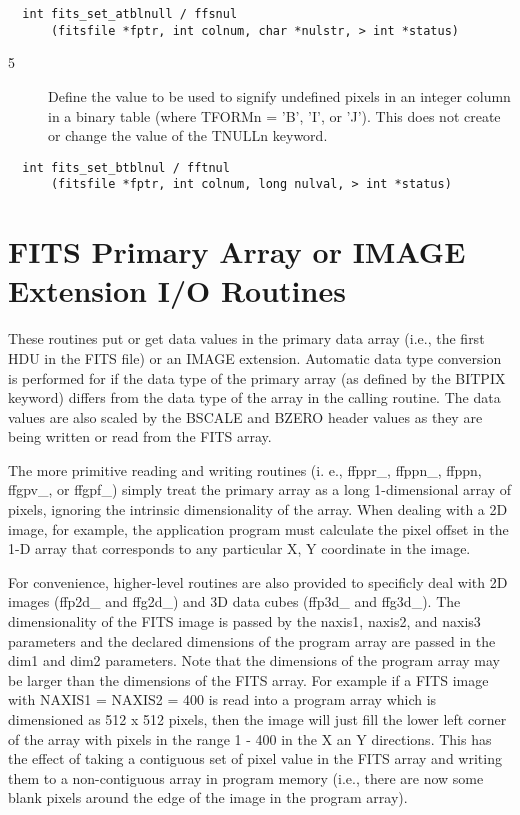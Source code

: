\begin{verbatim}
  int fits_set_atblnull / ffsnul
      (fitsfile *fptr, int colnum, char *nulstr, > int *status)
\end{verbatim}

\begin{description}
\item[5 ] Define the value to be used to signify undefined pixels in
    an integer column in a binary table (where TFORMn = 'B', 'I', or 'J').
   This does not create or  change the value of the TNULLn keyword.
\end{description}

\begin{verbatim}
  int fits_set_btblnul / fftnul
      (fitsfile *fptr, int colnum, long nulval, > int *status)
\end{verbatim}


\section{FITS Primary Array or IMAGE Extension I/O Routines}

These routines put or get data values in the primary data array (i.e.,
the first HDU in the FITS file) or an IMAGE extension.   Automatic data
type conversion is performed for if the data type of the primary array
(as defined by the BITPIX keyword) differs from the data type of the
array in the calling routine.  The data values are also scaled by the
BSCALE and BZERO header values as they are being written or read from
the FITS array.

The more primitive reading and writing routines (i. e., ffppr\_,
ffppn\_, ffppn, ffgpv\_, or ffgpf\_) simply treat the primary
array as a long 1-dimensional array of pixels, ignoring the
intrinsic dimensionality of the array.  When dealing with
a 2D image, for example, the application program must calculate
the pixel offset in the 1-D array that corresponds to any
particular X, Y coordinate in the image.

For convenience, higher-level routines are also provided to specificly
deal with 2D images (ffp2d\_ and ffg2d\_) and 3D data cubes (ffp3d\_
and ffg3d\_).  The dimensionality of the FITS image is passed by the
naxis1, naxis2, and naxis3 parameters and the declared dimensions of
the program array are passed in the dim1 and dim2 parameters.  Note
that the dimensions of the program array may be larger than the
dimensions of the FITS array.  For example if a FITS image with NAXIS1
= NAXIS2 = 400 is read into a program array which is dimensioned as 512
x 512 pixels, then the image will just fill the lower left corner of
the array with pixels in the range 1 - 400 in the X an Y directions.
This has the effect of taking a contiguous set of pixel value in the
FITS array and writing them to a non-contiguous array in program memory
(i.e., there are now some blank pixels around the edge of the image in
the program array).

